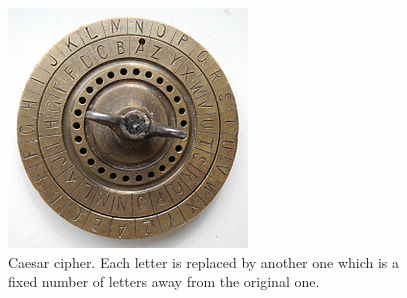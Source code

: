 \begin{refsection}
\begin{minipage}{0.45\linewidth}
	\begin{figure}[H]
		\centering
		\includegraphics[width=\linewidth]{../chapter00/CaesarCipher.jpg}
		\caption[Caesar cipher]{Caesar cipher. Each letter is replaced by another one which is a fixed number of letters away from the original one. }
	\end{figure}
\end{minipage}
\hfill
\begin{minipage}{0.45\linewidth}
	\begin{figure}[H]
		\centering

\end{figure}
\end{minipage}
\end{refsection}

